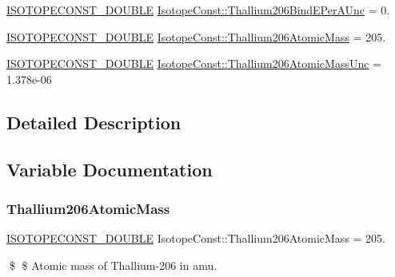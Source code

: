 \begin{DoxyCompactItemize}
\mbox{\hyperlink{group___isotope_const-_macros_ga8f45a7272ce02c0b4c65c44636ed719a}{I\+S\+O\+T\+O\+P\+E\+C\+O\+N\+S\+T\+\_\+\+D\+O\+U\+B\+LE}} \mbox{\hyperlink{group___isotope_const-_thallium-_tl206_gaf0262540b53751b1f7dc57830770fb7d}{Isotope\+Const\+::\+Thallium206\+Bind\+E\+Per\+A\+Unc}} = 0.
\item 
\mbox{\hyperlink{group___isotope_const-_macros_ga8f45a7272ce02c0b4c65c44636ed719a}{I\+S\+O\+T\+O\+P\+E\+C\+O\+N\+S\+T\+\_\+\+D\+O\+U\+B\+LE}} \mbox{\hyperlink{group___isotope_const-_thallium-_tl206_gaa6d450cc4203c114e10dcf42c1d2a40e}{Isotope\+Const\+::\+Thallium206\+Atomic\+Mass}} = 205.
\item 
\mbox{\hyperlink{group___isotope_const-_macros_ga8f45a7272ce02c0b4c65c44636ed719a}{I\+S\+O\+T\+O\+P\+E\+C\+O\+N\+S\+T\+\_\+\+D\+O\+U\+B\+LE}} \mbox{\hyperlink{group___isotope_const-_thallium-_tl206_gac16209b40e47954d0bc48b089525b81a}{Isotope\+Const\+::\+Thallium206\+Atomic\+Mass\+Unc}} = 1.\+378e-\/06
\end{DoxyCompactItemize}


\subsection{Detailed Description}


\subsection{Variable Documentation}
\mbox{\label{group___isotope_const-_thallium-_tl206_gaa6d450cc4203c114e10dcf42c1d2a40e}} 
\subsubsection{\texorpdfstring{Thallium206\+Atomic\+Mass}{Thallium206AtomicMass}}
{\footnotesize\ttfamily \mbox{\hyperlink{group___isotope_const-_macros_ga8f45a7272ce02c0b4c65c44636ed719a}{I\+S\+O\+T\+O\+P\+E\+C\+O\+N\+S\+T\+\_\+\+D\+O\+U\+B\+LE}} Isotope\+Const\+::\+Thallium206\+Atomic\+Mass = 205.}

\$ \$ Atomic mass of Thallium-\/206 in amu. \mbox{\label{group___isotope_const-_thallium-_tl206_gac16209b40e47954d0bc48b089525b81a}} 
